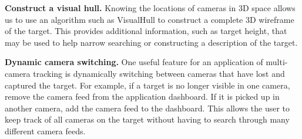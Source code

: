 \documentclass{article}
\begin{document}
\vspace{5pt}
\noindent\textbf{Construct a visual hull.} Knowing the locations of cameras in 3D space allows us to use an algorithm such as VisualHull to construct a complete 3D wireframe of the target. This provides additional information, such as target height, that may be used to help narrow searching or constructing a description of the target.

\vspace{5pt}
\noindent\textbf{Dynamic camera switching.} One useful feature for an application of multi-camera tracking is dynamically switching between cameras that have lost and captured the target. For example, if a target is no longer visible in one camera, remove the camera feed from the application dashboard. If it is picked up in another camera, add the camera feed to the dashboard. This allows the user to keep track of all cameras on the target without having to search through many different camera feeds.



\end{document}
